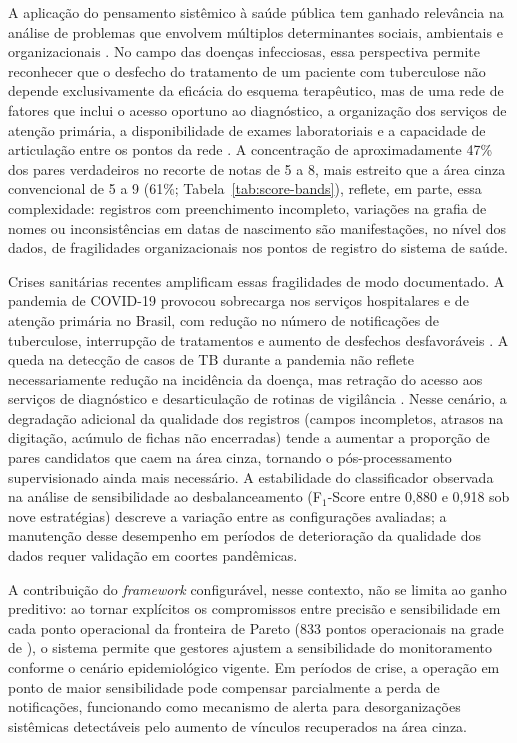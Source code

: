 A aplicação do pensamento sistêmico à saúde pública tem ganhado relevância na análise de problemas que envolvem múltiplos determinantes sociais, ambientais e organizacionais \cite{DiezRoux2011complexity, Adam2012systems}. No campo das doenças infecciosas, essa perspectiva permite reconhecer que o desfecho do tratamento de um paciente com tuberculose não depende exclusivamente da eficácia do esquema terapêutico, mas de uma rede de fatores que inclui o acesso oportuno ao diagnóstico, a organização dos serviços de atenção primária, a disponibilidade de exames laboratoriais e a capacidade de articulação entre os pontos da rede \cite{Mendes2011redes}. A concentração de aproximadamente 47\% dos pares verdadeiros no recorte de notas de 5 a 8, mais estreito que a área cinza convencional de 5 a 9 (61\%; Tabela~\ref{tab:score-bands}), reflete, em parte, essa complexidade: registros com preenchimento incompleto, variações na grafia de nomes ou inconsistências em datas de nascimento são manifestações, no nível dos dados, de fragilidades organizacionais nos pontos de registro do sistema de saúde.

Crises sanitárias recentes amplificam essas fragilidades de modo documentado. A pandemia de COVID-19 provocou sobrecarga nos serviços hospitalares e de atenção primária no Brasil, com redução no número de notificações de tuberculose, interrupção de tratamentos e aumento de desfechos desfavoráveis \cite{Ranzani2021covid, Maia2022covid_tb}. A queda na detecção de casos de TB durante a pandemia não reflete necessariamente redução na incidência da doença, mas retração do acesso aos serviços de diagnóstico e desarticulação de rotinas de vigilância \cite{Hallal2020covid}. Nesse cenário, a degradação adicional da qualidade dos registros (campos incompletos, atrasos na digitação, acúmulo de fichas não encerradas) tende a aumentar a proporção de pares candidatos que caem na área cinza, tornando o pós-processamento supervisionado ainda mais necessário. A estabilidade do classificador observada na análise de sensibilidade ao desbalanceamento (F$_1$-Score entre 0,880 e 0,918 sob nove estratégias) descreve a variação entre as configurações avaliadas; a manutenção desse desempenho em períodos de deterioração da qualidade dos dados requer validação em coortes pandêmicas.

A contribuição do \textit{framework} configurável, nesse contexto, não se limita ao ganho preditivo: ao tornar explícitos os compromissos entre precisão e sensibilidade em cada ponto operacional da fronteira de Pareto (833 pontos operacionais na grade de ), o sistema permite que gestores ajustem a sensibilidade do monitoramento conforme o cenário epidemiológico vigente. Em períodos de crise, a operação em ponto de maior sensibilidade pode compensar parcialmente a perda de notificações, funcionando como mecanismo de alerta para desorganizações sistêmicas detectáveis pelo aumento de vínculos recuperados na área cinza.


